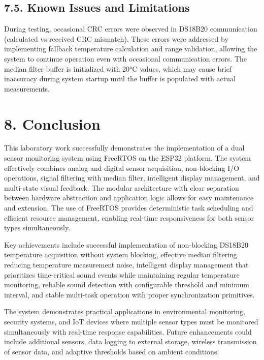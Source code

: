 \documentclass[12pt]{article}
\begin{document}
\subsection*{7.5. Known Issues and Limitations}

During testing, occasional CRC errors were observed in DS18B20 communication (calculated vs received CRC mismatch). These errors were addressed by implementing fallback temperature calculation and range validation, allowing the system to continue operation even with occasional communication errors. The median filter buffer is initialized with 20°C values, which may cause brief inaccuracy during system startup until the buffer is populated with actual measurements.

\section*{8. Conclusion}

This laboratory work successfully demonstrates the implementation of a dual sensor monitoring system using FreeRTOS on the ESP32 platform. The system effectively combines analog and digital sensor acquisition, non-blocking I/O operations, signal filtering with median filter, intelligent display management, and multi-state visual feedback. The modular architecture with clear separation between hardware abstraction and application logic allows for easy maintenance and extension. The use of FreeRTOS provides deterministic task scheduling and efficient resource management, enabling real-time responsiveness for both sensor types simultaneously.

Key achievements include successful implementation of non-blocking DS18B20 temperature acquisition without system blocking, effective median filtering reducing temperature measurement noise, intelligent display management that prioritizes time-critical sound events while maintaining regular temperature monitoring, reliable sound detection with configurable threshold and minimum interval, and stable multi-task operation with proper synchronization primitives.

The system demonstrates practical applications in environmental monitoring, security systems, and IoT devices where multiple sensor types must be monitored simultaneously with real-time response capabilities. Future enhancements could include additional sensors, data logging to external storage, wireless transmission of sensor data, and adaptive thresholds based on ambient conditions.
\end{document}
